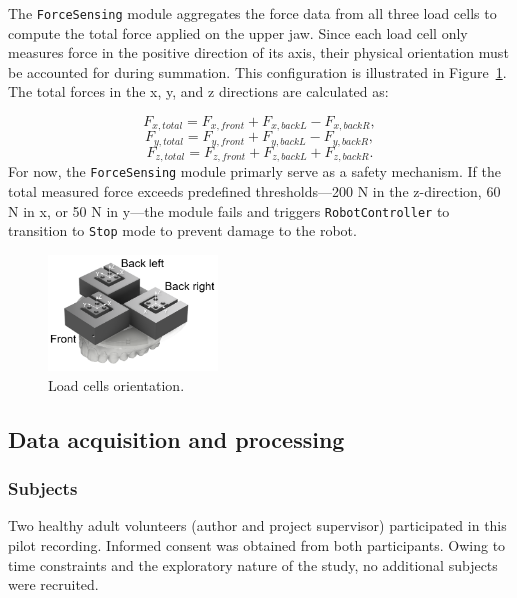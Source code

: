 The \texttt{ForceSensing} module aggregates the force data from all three load cells to compute the total force applied on the upper jaw. 
Since each load cell only measures force in the positive direction of its axis, their physical orientation must be accounted for during summation. 
This configuration is illustrated in Figure~\ref{fig:load_cells_axis}. The total forces in the x, y, and z directions are calculated as:

\begin{equation}
  F_{x,total} = F_{x,front} + F_{x,backL} - F_{x,backR},
\end{equation}
\begin{equation}
  F_{y,total} = F_{y,front} + F_{y,backL} - F_{y,backR},
\end{equation}
\begin{equation}
  F_{z,total} = F_{z,front} + F_{z,backL} + F_{z,backR}.
\end{equation}
For now, the \texttt{ForceSensing} module primarly serve as a safety mechanism. If the total measured force exceeds predefined 
thresholds—200 N in the z-direction, 60 N in x, or 50 N in y—the module fails and triggers \texttt{RobotController} to transition to \texttt{Stop} mode 
to prevent damage to the robot.

\begin{figure}[H]
\centering
\includegraphics[width=0.4\textwidth]{figures/load_cells_axis.drawio.png}
\caption{Load cells orientation.}
\label{fig:load_cells_axis}
\end{figure}

\subsection{Data acquisition and processing}
\label{sec:motion-capture}

\subsubsection{Subjects} 
Two healthy adult volunteers (author and project supervisor) participated in this pilot recording. Informed consent was obtained from both participants. 
Owing to time constraints and the exploratory nature of the study, no additional subjects were recruited. 

